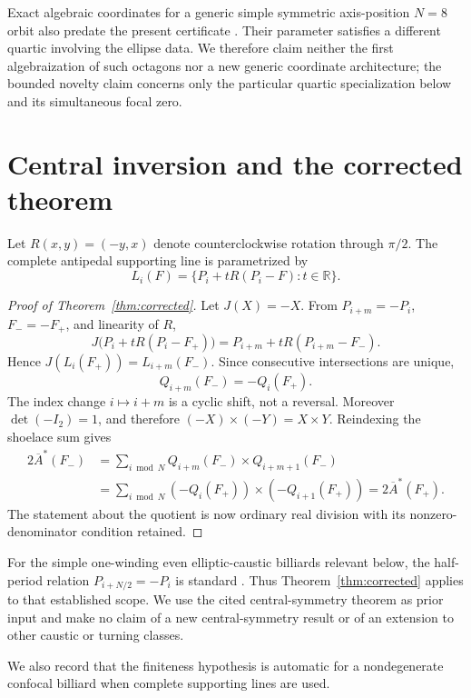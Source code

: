 \documentclass[11pt,a4paper]{amsart}
\theoremstyle{definition}
\theoremstyle{remark}
\newcommand{\R}{\mathbb R}
\newcommand{\Abar}{\overline A}
\newcommand{\cross}{\mathbin{\times}}
\begin{document}
Exact algebraic coordinates for a generic simple symmetric axis-position
$N=8$ orbit also predate the present certificate
\cite[Appendix~B.7.1]{GarciaReznik2022}.  Their parameter satisfies a
different quartic involving the ellipse data.  We therefore claim neither
the first algebraization of such octagons nor a new generic coordinate
architecture; the bounded novelty claim concerns only the particular quartic
specialization below and its simultaneous focal zero.

\section{Central inversion and the corrected theorem}

Let $R(x,y)=(-y,x)$ denote counterclockwise rotation through $\pi/2$.
The complete antipedal supporting line is parametrized by
\begin{equation}\label{eq:line-param}
 L_i(F)=\{P_i+tR(P_i-F):t\in\R\}.
\end{equation}

\begin{proof}[Proof of Theorem~\ref{thm:corrected}]
Let $J(X)=-X$.  From $P_{i+m}=-P_i$, $F_-=-F_+$, and linearity of $R$,
\[
 J\bigl(P_i+tR(P_i-F_+)\bigr)
 =P_{i+m}+tR(P_{i+m}-F_-).
\]
Hence $J(L_i(F_+))=L_{i+m}(F_-)$.  Since consecutive intersections are
unique,
\[
 Q_{i+m}(F_-)=-Q_i(F_+).
\]
The index change $i\mapsto i+m$ is a cyclic shift, not a reversal.  Moreover
$\det(-I_2)=1$, and therefore $(-X)\cross(-Y)=X\cross Y$.  Reindexing the
shoelace sum gives
\[
 \begin{aligned}
 2\Abar^*(F_-)
 &=\sum_{i\bmod N}Q_{i+m}(F_-)\cross Q_{i+m+1}(F_-)\\
 &=\sum_{i\bmod N}(-Q_i(F_+))\cross(-Q_{i+1}(F_+))
 =2\Abar^*(F_+).
 \end{aligned}
\]
The statement about the quotient is now ordinary real division with its
nonzero-denominator condition retained.
\end{proof}

For the simple one-winding even elliptic-caustic billiards relevant below,
the half-period relation $P_{i+N/2}=-P_i$ is standard
\cite[Cor.~4.2(i)]{Stachel2021}.  Thus Theorem~\ref{thm:corrected} applies to
that established scope.  We use the cited central-symmetry theorem as prior
input and make no claim of a new central-symmetry result or of an extension to
other caustic or turning classes.

We also record that the finiteness hypothesis is automatic for a
nondegenerate confocal billiard when complete supporting lines are used.
\end{document}
